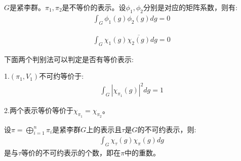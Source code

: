 \begin{theorem}[Schur正交化定理]
    $G$是紧李群。$\pi_1,\pi_2$是不等价的表示。设$\phi_1,\phi_2$分别是对应的矩阵系数，则有:
    \begin{align*}
        \int_G \phi_1(g)\phi_2(g)dg=0
    \end{align*}
\end{theorem}
\begin{corollary}
    \begin{align*}
    \int_G \chi_1(g)\overline{\chi_2(g)}dg=0
    \end{align*}
\end{corollary}
下面两个判别法可以判定是否有等价表示:
\begin{theorem}
    1.$(\pi_1,V_1)$不可约等价于:
    \begin{align*}
        \int_G |\chi_{\pi_1}(g)|^2dg=1
    \end{align*}
    
    2.两个表示等价等价于$\chi_{\pi_1}=\chi_{\pi_2}$。
\end{theorem}
\begin{remark}
    设$\pi=\bigoplus_{i=1}^n \pi_i$是紧李群$G$上的表示且$\tau$是$G$的不可约表示，则:
    \begin{align*}
        \int_G \chi_{\tau}(g)\chi_{\pi}(g)dg
    \end{align*}
    是与$\tau$等价的不可约表示的个数，即在$\pi$中的重数。
\end{remark}
